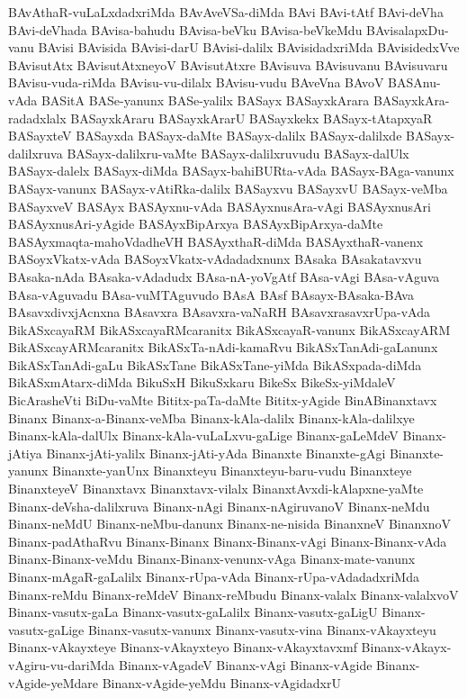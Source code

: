 {BAvAthaR-vuLaLxdadxriMda
BAvAveVSa-diMda
BAvi
BAvi-tAtf
BAvi-deVha
BAvi-deVhada
BAvisa-bahudu
BAvisa-beVku
BAvisa-beVkeMdu
BAvisalapxDu-vanu
BAvisi
BAvisida
BAvisi-darU
BAvisi-dalilx
BAvisidadxriMda
BAvisidedxVve
BAvisutAtx
BAvisutAtxneyoV
BAvisutAtxre
BAvisuva
BAvisuvanu
BAvisuvaru
BAvisu-vuda-riMda
BAvisu-vu-dilalx
BAvisu-vudu
BAveVna
BAvoV
BASAnu-vAda
BASitA
BASe-yanunx
BASe-yalilx
BASayx
BASayxkArara
BASayxkAra-radadxlalx
BASayxkAraru
BASayxkArarU
BASayxkekx
BASayx-tAtapxyaR
BASayxteV
BASayxda
BASayx-daMte
BASayx-dalilx
BASayx-dalilxde
BASayx-dalilxruva
BASayx-dalilxru-vaMte
BASayx-dalilxruvudu
BASayx-dalUlx
BASayx-dalelx
BASayx-diMda
BASayx-bahiBURta-vAda
BASayx-BAga-vanunx
BASayx-vanunx
BASayx-vAtiRka-dalilx
BASayxvu
BASayxvU
BASayx-veMba
BASayxveV
BASAyx
BASAyxnu-vAda
BASAyxnusAra-vAgi
BASAyxnusAri
BASAyxnusAri-yAgide
BASAyxBipArxya
BASAyxBipArxya-daMte
BASAyxmaqta-mahoVdadheVH
BASAyxthaR-diMda
BASAyxthaR-vanenx
BASoyxVkatx-vAda
BASoyxVkatx-vAdadadxnunx
BAsaka
BAsakatavxvu
BAsaka-nAda
BAsaka-vAdadudx
BAsa-nA-yoVgAtf
BAsa-vAgi
BAsa-vAguva
BAsa-vAguvadu
BAsa-vuMTAguvudo
BAsA
BAsf
BAsayx-BAsaka-BAva
BAsavxdivxjAcnxna
BAsavxra
BAsavxra-vaNaRH
BAsavxrasavxrUpa-vAda
BikASxcayaRM
BikASxcayaRMcaranitx
BikASxcayaR-vanunx
BikASxcayARM
BikASxcayARMcaranitx
BikASxTa-nAdi-kamaRvu
BikASxTanAdi-gaLanunx
BikASxTanAdi-gaLu
BikASxTane
BikASxTane-yiMda
BikASxpada-diMda
BikASxmAtarx-diMda
BikuSxH
BikuSxkaru
BikeSx
BikeSx-yiMdaleV
BicArasheVti
BiDu-vaMte
Bititx-paTa-daMte
Bititx-yAgide
BinABinanxtavx
Binanx
Binanx-a-Binanx-veMba
Binanx-kAla-dalilx
Binanx-kAla-dalilxye
Binanx-kAla-dalUlx
Binanx-kAla-vuLaLxvu-gaLige
Binanx-gaLeMdeV
Binanx-jAtiya
Binanx-jAti-yalilx
Binanx-jAti-yAda
Binanxte
Binanxte-gAgi
Binanxte-yanunx
Binanxte-yanUnx
Binanxteyu
Binanxteyu-baru-vudu
Binanxteye
BinanxteyeV
Binanxtavx
Binanxtavx-vilalx
BinanxtAvxdi-kAlapxne-yaMte
Binanx-deVsha-dalilxruva
Binanx-nAgi
Binanx-nAgiruvanoV
Binanx-neMdu
Binanx-neMdU
Binanx-neMbu-danunx
Binanx-ne-nisida
BinanxneV
BinanxnoV
Binanx-padAthaRvu
Binanx-Binanx
Binanx-Binanx-vAgi
Binanx-Binanx-vAda
Binanx-Binanx-veMdu
Binanx-Binanx-venunx-vAga
Binanx-mate-vanunx
Binanx-mAgaR-gaLalilx
Binanx-rUpa-vAda
Binanx-rUpa-vAdadadxriMda
Binanx-reMdu
Binanx-reMdeV
Binanx-reMbudu
Binanx-valalx
Binanx-valalxvoV
Binanx-vasutx-gaLa
Binanx-vasutx-gaLalilx
Binanx-vasutx-gaLigU
Binanx-vasutx-gaLige
Binanx-vasutx-vanunx
Binanx-vasutx-vina
Binanx-vAkayxteyu
Binanx-vAkayxteye
Binanx-vAkayxteyo
Binanx-vAkayxtavxmf
Binanx-vAkayx-vAgiru-vu-dariMda
Binanx-vAgadeV
Binanx-vAgi
Binanx-vAgide
Binanx-vAgide-yeMdare
Binanx-vAgide-yeMdu
Binanx-vAgidadxrU
}
